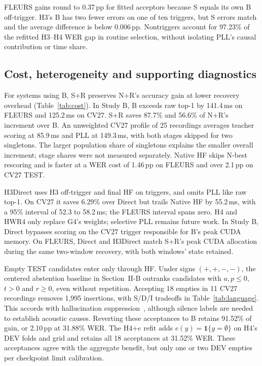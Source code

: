 FLEURS gains round to 0.37\,pp for fitted acceptors because S equals its own B off-trigger. H3's B has two fewer errors on one of ten triggers, but S errors match and the average difference is below 0.006\,pp. Nontriggers account for 97.23\% of the refitted H3--H4 WER gap in routine selection, without isolating PLL's causal contribution or time share.

\subsection{Cost, heterogeneity and supporting diagnostics}
For systems using B, S+R preserves N+R's accuracy gain at lower recovery overhead (Table~\ref{tab:cost}). In Study B, B exceeds raw top-1 by 141.4\,ms on FLEURS and 125.2\,ms on CV27. S+R saves 87.7\% and 56.6\% of N+R's increment over B. An unweighted CV27 profile of 25 recordings averages teacher scoring at 85.9\,ms and PLL at 149.3\,ms, with both stages skipped for two singletons. The larger population share of singletons explains the smaller overall increment; stage shares were not measured separately. Native HF skips N-best rescoring and is faster at a WER cost of 1.46\,pp on FLEURS and over 2.1\,pp on CV27 TEST.

H3Direct uses H3 off-trigger and final HF on triggers, and omits PLL like raw top-1. On CV27 it saves 6.29\% over Direct but trails Native HF by 55.2\,ms, with a 95\% interval of 52.3 to 58.2\,ms; the FLEURS interval spans zero.
H4 and HWR4 only replace G4's weights; selective PLL remains future work. In Study B, Direct bypasses scoring on the CV27 trigger responsible for B's peak CUDA memory. On FLEURS, Direct and H3Direct match S+R's peak CUDA allocation during the same two-window recovery, with both windows' state retained.


Empty TEST candidates enter only through HF. Under signs $(+,+,-,-)$, the centered abstention baseline in Section~II-B outranks candidates with $a,p\le0$, $t>0$ and $r\ge0$, even without repetition. Accepting 18 empties in 11 CV27 recordings removes 1,995 insertions, with S/D/I tradeoffs in Table~\ref{tab:language}. This accords with hallucination suppression~\cite{baranski2025nonspeech}, although silence labels are needed to establish acoustic causes. Reverting these acceptances to B retains 91.52\% of gain, or 2.10\,pp at 31.88\% WER. The H4+$e$ refit adds $e(y)=\mathbf1\{y=\emptyset\}$ on H4's DEV folds and grid and retains all 18 acceptances at 31.52\% WER. These acceptances agree with the aggregate benefit, but only one or two DEV empties per checkpoint limit calibration.

